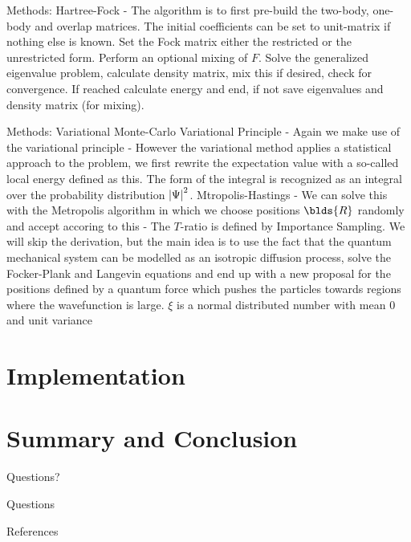 \documentclass[10pt]{beamer}
\begin{document}
\begin{frame}[fragile]{Methods: Hartree-Fock}
    - The algorithm is to first pre-build the two-body, one-body and overlap
    matrices. The initial coefficients can be set to unit-matrix if nothing
    else is known. Set the Fock matrix either the restricted or the
    unrestricted form. Perform an optional mixing of $F$. Solve the generalized
    eigenvalue problem, calculate density matrix, mix this if desired, check
    for convergence. If reached calculate energy and end, if not save
    eigenvalues and density matrix (for mixing).
\end{frame}

\begin{frame}[fragile]{Methods: Variational Monte-Carlo}
    Variational Principle
        - Again we make use of the variational principle
        - However the variational method applies a statistical approach to the
        problem, we first rewrite the expectation value with a so-called local
        energy defined as this. The form of the integral is recognized as an
        integral over the probability distribution $\abs{\Psi}^2$.
   Mtropolis-Hastings
        - We can solve this with the Metropolis algorithm in which we choose
        positions $\blds{R}$ randomly and accept accoring to this
        - The $T$-ratio is defined by Importance Sampling. We will skip the
        derivation, but the main idea is to use the fact that the quantum
        mechanical system can be modelled as an isotropic diffusion process,
        solve the Focker-Plank and Langevin equations and end up with a new
        proposal for the positions defined by a quantum force which pushes the
        particles towards regions where the wavefunction is large. $\xi$ is a
        normal distributed number with mean $0$ and unit variance
\end{frame}

\section{Implementation}
\section{Summary and Conclusion}

{
\begin{frame}[standout]
  Questions?
\end{frame}
}

\appendix

\begin{frame}[fragile]{Questions}
\end{frame}

\begin{frame}[allowframebreaks]{References}

  
  

\end{frame}
\end{document}
